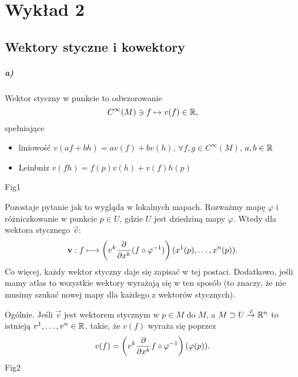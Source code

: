 \documentclass[11pt]{book}
\theoremstyle{definition} %
\theoremstyle{plain} %
\theoremstyle{remark} %
\theoremstyle{underline}
\begin{document}
  \frontmatter


  \tableofcontents


  \mainmatter


  \chapter{Wykład 2}
  \section{Wektory styczne i kowektory}
  \paragraph{a)} Wektor styczny w punkcie to odwzorowanie
  \begin{displaymath}
    C^\infty(M) \ni f \mapsto v(f) \in \mathbb{R},
  \end{displaymath}
  spełniające
  \begin{itemize}
    \item liniowość $v(a f + b h) = a v(f) + b v(h)$, $\forall f,g \in C^\infty(M)$, $a,b \in \mathbb{R}$
    \item Leinbniz $v(fh) = f(p) v(h) + v(f) h(p)$
  \end{itemize}

  \todo Fig1

  Pozostaje pytanie jak to wygląda w lokalnych mapach. 
  Rozważmy mapę $\varphi$ i różniczkowanie w punkcie $p \in U$, gdzie $U$ jest dziedziną mapy $\varphi$.
  Wtedy dla wektora stycznego $\vec v$:
  \begin{equation}
    \mathbf{v}: f \longmapsto \left( v^k \frac{\partial }{\partial x^k} (f \circ \varphi^{-1}) \right) (x^1(p), \dots, x^n(p)).
  \end{equation}
  Co więcej, każdy wektor styczny daje się zapisać w tej postaci.
  Dodatkowo, jeśli mamy atlas to wszystkie wektory wyrażają się w ten sposób (to znaczy, że nie musimy szukać nowej mapy
  dla każdego z wektorów stycznych).

  Ogólnie. Jeśli $\vec v$ jest wektorem stycznym w $p \in M$ do $M$, a $M \supset U \overset{\varphi}{\rightarrow}\mathbb{R}^n$
  to istnieją $v^1, \dots, v^n \in \mathbb{R}$, takie, że $v(f)$ wyraża się poprzez
  \begin{displaymath}
    v(f) = \left(v^k \frac{\partial }{\partial x^k } f\circ \varphi^{-1}\right) (\varphi(p)).
  \end{displaymath}
  \todo Fig2
\end{document}
